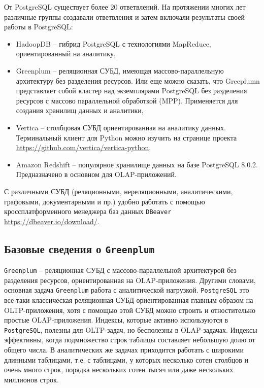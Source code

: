 \documentclass[%
	11pt,
	a4paper,
	utf8,
		]{article}
\begin{document}
От PostgreSQL существует более 20 ответвлений. На протяжении многих лет различные группы создавали ответвления и затем включали результаты своей работы в PostgreSQL:
\begin{itemize}
	\item HadoopDB -- гибрид PostgreSQL с технологиями MapReduce, ориентированный на аналитику,
	
	\item Greenplum -- реляционная СУБД, имеющая массово-параллельную архитектуру без разделения ресурсов. Или еще можно сказать, что Greeplumn представляет собой кластер над экземплярами PostgreSQL без разделения ресурсов с массово параллельной обработкой (MPP). Применяется для создания хранилищ данных и аналитики,
	
	\item Vertica -- столбцовая СУБД ориентированная на аналитику данных. Терминальный клиент для Python можно изучить на странице проекта \url{https://github.com/vertica/vertica-python},
	
	\item Amazon Redshift -- популярное хранилище данных на базе PostgreSQL 8.0.2. Предназначено в основном для OLAP-приложений. 
\end{itemize}

С различными СУБД (реляционными, нереляционными, аналитическими, графовыми, документарными и пр.) удобно работать с помощью кроссплатформенного менеджера баз данных \texttt{DBeaver} \url{https://dbeaver.io/download/}.

\subsection{Базовые сведения о \texttt{Greenplum}}

\texttt{Greenplum} -- реляционная СУБД с массово-параллельной архитектурой без разделения ресурсов, ориентированная на OLAP-приложения. Другими словами, основная задача \texttt{Greenplum} работа с аналитической нагрузкой. \texttt{PostgreSQL} это все-таки классическая реляционная СУБД ориентированная главным образом на OLTP-приложения, хотя с помощью этой СУБД можно строить и отностительно простые OLAP-приложения. Индексы, которые активно используются в \texttt{PostgreSQL}, полезны для OLTP-задач, но бесполезны в OLAP-задачах. Индексы эффективны, когда подмножество строк таблицы составляет небольшую долю от общего числа. В аналитических же задачах приходится работать с широкими длинными таблицами, т.е. с таблицами, у которых несколько сотен столбцов и очень много строк, порядка нескольких сотен тысяч или даже нескольких миллионов строк.
\end{document}
